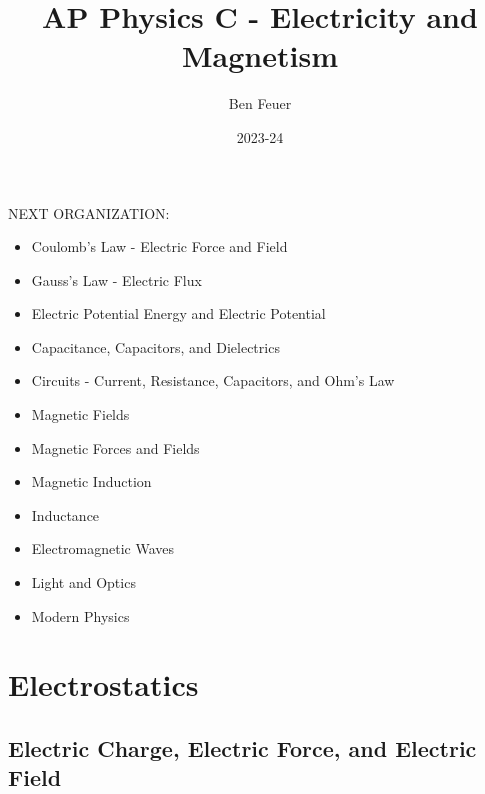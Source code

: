 \documentclass{report}
\title{\Huge{AP Physics C - Electricity and Magnetism}}
\author{\huge{Ben Feuer}}
\date{2023-24}
\begin{document}
\maketitle
\newpage%
\setcounter{tocdepth}{3}
\tableofcontents
\pagebreak




NEXT ORGANIZATION:
\begin{itemize}
  \item Coulomb's Law - Electric Force and Field 
  \item Gauss's Law - Electric Flux 
  \item Electric Potential Energy and Electric Potential 
  \item Capacitance, Capacitors, and Dielectrics
  \item Circuits - Current, Resistance, Capacitors, and Ohm's Law
  \item Magnetic Fields 
  \item Magnetic Forces and Fields 
  \item Magnetic Induction 
  \item Inductance
  \item Electromagnetic Waves
  \item Light and Optics
  \item Modern Physics
\end{itemize}


\chapter{Electrostatics}

\section{Electric Charge, Electric Force, and Electric Field}
\end{document}
